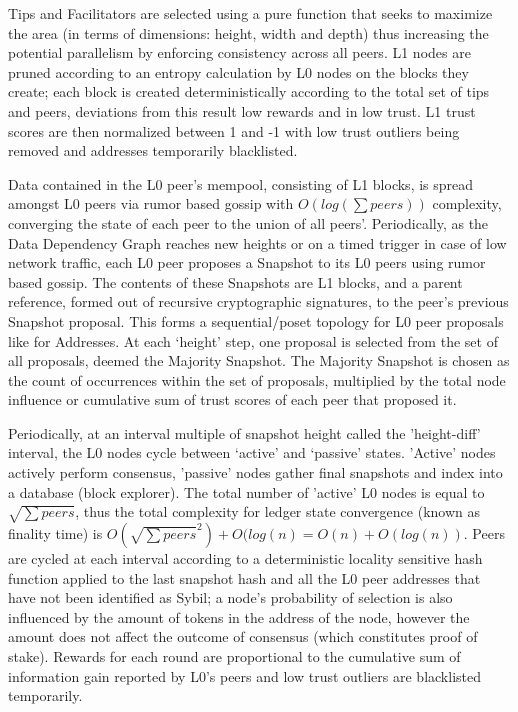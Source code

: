 \documentclass{article}
\begin{document}
Tips and Facilitators are selected using a pure function that seeks to maximize the area (in terms of dimensions: height, width and depth) thus increasing the potential parallelism by enforcing consistency across all peers. L1 nodes are pruned according to an entropy calculation by L0 nodes on the blocks they create; each block is created deterministically according to the total set of tips and peers, deviations from this result low rewards and in low trust. L1 trust scores are then normalized between 1 and -1 with low trust outliers being removed and addresses temporarily blacklisted.

Data contained in the L0 peer's mempool, consisting of L1 blocks, is spread amongst L0 peers via rumor based gossip with $O(log(\sum peers))$ complexity, converging the state of each peer to the union of all peers'. Periodically, as the Data Dependency Graph reaches new heights or on a timed trigger in case of low network traffic, each L0 peer proposes a Snapshot to its L0 peers using rumor based gossip. The contents of these Snapshots are L1 blocks, and a parent reference, formed out of recursive cryptographic signatures, to the peer’s previous Snapshot proposal. This forms a sequential/poset topology for L0 peer proposals like for Addresses. At each ‘height’ step, one proposal is selected from the set of all proposals, deemed the Majority Snapshot. The Majority Snapshot is chosen as the count of occurrences within the set of proposals, multiplied by the total  node influence or cumulative sum of trust scores of each peer that proposed it. 
	
Periodically, at an interval multiple of snapshot height called the 'height-diff' interval, the L0 nodes cycle between ‘active’ and ‘passive’ states. 'Active' nodes actively perform consensus, 'passive' nodes gather final snapshots and index into a database (block explorer). The total number of 'active' L0 nodes is equal to $\sqrt{\sum peers}$, thus the total complexity for ledger state convergence (known as finality time) is $O(\sqrt{\sum peers}^2) + O(log(n)= O(n) + O(log(n))$. Peers are cycled at each interval according to a deterministic locality sensitive hash function applied to the last snapshot hash and all the L0 peer addresses that have not been identified as Sybil; a node's probability of selection is also influenced by the amount of tokens in the address of the node, however the amount does not affect the outcome of consensus (which constitutes proof of stake). Rewards for each round are proportional to the cumulative sum of information gain reported by L0’s peers and low trust outliers are blacklisted temporarily.
\end{document}
